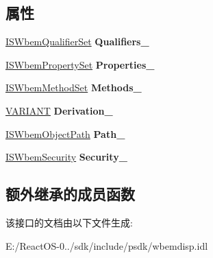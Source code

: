 \subsection*{属性}
\begin{DoxyCompactItemize}
\item 
\mbox{\label{interface_wbem_scripting_1_1_i_s_wbem_object_add217507c2b5e1a4ecfda975a61f5369}} 
\hyperlink{interface_wbem_scripting_1_1_i_s_wbem_qualifier_set}{I\+S\+Wbem\+Qualifier\+Set} {\bfseries Qualifiers\+\_\+}
\item 
\mbox{\label{interface_wbem_scripting_1_1_i_s_wbem_object_a2a3c98f538a1d346719e0c30b91ca4ea}} 
\hyperlink{interface_wbem_scripting_1_1_i_s_wbem_property_set}{I\+S\+Wbem\+Property\+Set} {\bfseries Properties\+\_\+}
\item 
\mbox{\label{interface_wbem_scripting_1_1_i_s_wbem_object_a38d740368c2e916240425c1e2d63c918}} 
\hyperlink{interface_wbem_scripting_1_1_i_s_wbem_method_set}{I\+S\+Wbem\+Method\+Set} {\bfseries Methods\+\_\+}
\item 
\mbox{\label{interface_wbem_scripting_1_1_i_s_wbem_object_ad7d1c4570eff65ae76718f77884df1c2}} 
\hyperlink{structtag_v_a_r_i_a_n_t}{V\+A\+R\+I\+A\+NT} {\bfseries Derivation\+\_\+}
\item 
\mbox{\label{interface_wbem_scripting_1_1_i_s_wbem_object_a3d4213a06da12e679eb302a677b00a10}} 
\hyperlink{interface_wbem_scripting_1_1_i_s_wbem_object_path}{I\+S\+Wbem\+Object\+Path} {\bfseries Path\+\_\+}
\item 
\mbox{\label{interface_wbem_scripting_1_1_i_s_wbem_object_a2d128b2c616add85e5665b9302d88338}} 
\hyperlink{interface_wbem_scripting_1_1_i_s_wbem_security}{I\+S\+Wbem\+Security} {\bfseries Security\+\_\+}
\end{DoxyCompactItemize}
\subsection*{额外继承的成员函数}


该接口的文档由以下文件生成\+:\begin{DoxyCompactItemize}
\item 
E\+:/\+React\+O\+S-\/0../sdk/include/psdk/wbemdisp.\+idl\end{DoxyCompactItemize}

